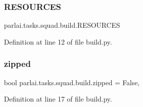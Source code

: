 \subsubsection{\texorpdfstring{R\+E\+S\+O\+U\+R\+C\+ES}{RESOURCES}}
{\footnotesize\ttfamily parlai.\+tasks.\+squad.\+build.\+R\+E\+S\+O\+U\+R\+C\+ES}



Definition at line 12 of file build.\+py.

\mbox{\label{namespaceparlai_1_1tasks_1_1squad_1_1build_a0d83c96a6ba49e4b7d574443c5143c52}} 
\subsubsection{\texorpdfstring{zipped}{zipped}}
{\footnotesize\ttfamily bool parlai.\+tasks.\+squad.\+build.\+zipped = False,}



Definition at line 17 of file build.\+py.

